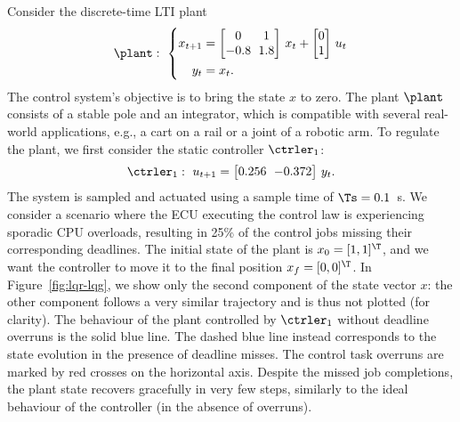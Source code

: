 \begin{example}%
    Consider the discrete-time LTI plant
     \begin{equation}
        \label{eq:example-plant}
        {\setlength\arraycolsep{3pt}
            \plant: \,\, \left\{
            \begin{aligned}
                x_{t+1} &= 
                \begin{bmatrix}
                    0 & 1 \\
                    -0.8 & 1.8
                \end{bmatrix}\,x_t + 
                \begin{bmatrix}
                    0 \\
                    1
                \end{bmatrix}\,u_t \\
                y_t &= x_t.
                 \end{aligned}
            \right.
        }
    \end{equation}   
    The control system's objective is to bring the state $x$ to zero.
    The plant $\plant$ consists of a stable pole and an integrator, which is compatible with several real-world applications, e.g., a cart on a rail or a joint of a robotic arm.
    To regulate the plant, we first consider the static controller $\ctrler_1$:
    \begin{equation*}
        {\setlength\arraycolsep{3pt}
        \begin{aligned}
            \ctrler_1: \,\, 
            u_{t+1} = 
            \begin{bmatrix}
                0.256 & -0.372
            \end{bmatrix}\,y_t.
        \end{aligned}
        }
    \end{equation*}
    The system is sampled and actuated using a sample time of $\Ts = 0.1$~s.
    We consider a scenario where the ECU executing the control law is experiencing sporadic CPU overloads, resulting in 25\% of the control jobs missing their corresponding deadlines.
    The initial state of the plant is $x_0 = [1, 1]^\T$, and we want the controller to move it to the final position $x_{f} = [0, 0]^\T$.
    In Figure~\ref{fig:lqr-lqg}, we show only the second component of the state vector $x$: the other component follows a very similar trajectory and is thus not plotted (for clarity).
    The behaviour of the plant controlled by $\ctrler_1$ without deadline overruns is the solid blue line.
    The dashed blue line instead corresponds to the state evolution in the presence of deadline misses.
    The control task overruns are marked by red crosses on the horizontal axis.
    Despite the missed job completions, the plant state recovers gracefully in very few steps, similarly to the ideal behaviour of the controller (in the absence of overruns).
    

\end{example}
